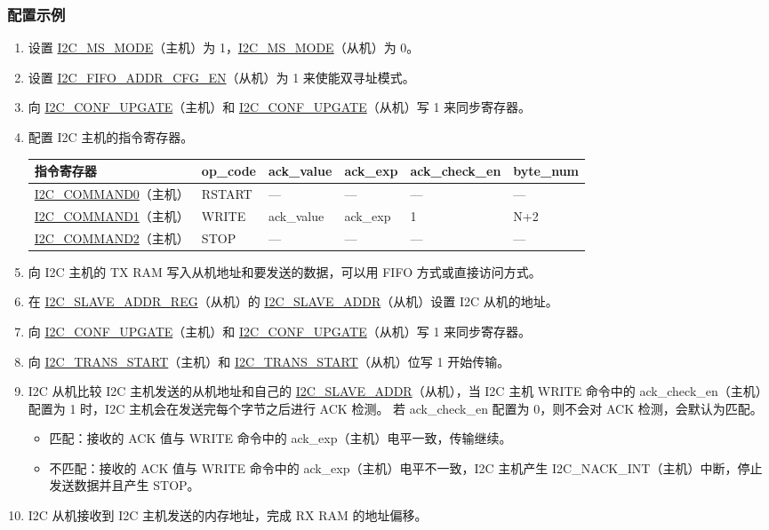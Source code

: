 \documentclass[main\_\_CN.tex]{subfiles}
\begin{document}
\subsubsection{配置示例}
\begin{enumerate}
\item 设置 \hyperref[fielddesc:I2CMSMODE]{I2C\_MS\_MODE}（主机）为 1，\hyperref[fielddesc:I2CMSMODE]{I2C\_MS\_MODE}（从机）为 0。
\item 设置 \hyperref[fielddesc:I2CFIFOADDRCFGEN]{I2C\_FIFO\_ADDR\_CFG\_EN}（从机）为 1 来使能双寻址模式。
\item 向 \hyperref[fielddesc:I2CCONFUPGATE]{I2C\_CONF\_UPGATE}（主机）和 \hyperref[fielddesc:I2CCONFUPGATE]{I2C\_CONF\_UPGATE}（从机）写 1 来同步寄存器。
\item 配置 I2C 主机的指令寄存器。
\begin{longtable}{ | p{4cm} | p{2cm} | p{2cm} | p{2cm} |p{2cm} | p{2cm} |}
\hline\rowcolor{lightgray}
指令寄存器& op\_code & ack\_value&ack\_exp&ack\_check\_en&byte\_num  \\ \hline
\hyperref[fielddesc:I2CCOMMAND0]{I2C\_COMMAND0}（主机）& RSTART& ---&---&---&---  \\ \hline
\hyperref[fielddesc:I2CCOMMAND1]{I2C\_COMMAND1}（主机）& WRITE& ack\_value&ack\_exp&1&N+2  \\ \hline
\hyperref[fielddesc:I2CCOMMAND2]{I2C\_COMMAND2}（主机）& STOP& ---&---&---&---  \\ \hline
\end{longtable}
\item 向 I2C 主机的 TX RAM 写入从机地址和要发送的数据，可以用 FIFO 方式或直接访问方式。
\item 在 \hyperref[regdesc:I2CSLAVEADDRREG]{I2C\_SLAVE\_ADDR\_REG}（从机）的 \hyperref[fielddesc:I2CSLAVEADDR]{I2C\_SLAVE\_ADDR}（从机）设置 I2C 从机的地址。
\item 向 \hyperref[fielddesc:I2CCONFUPGATE]{I2C\_CONF\_UPGATE}（主机）和 \hyperref[fielddesc:I2CCONFUPGATE]{I2C\_CONF\_UPGATE}（从机）写 1 来同步寄存器。
\item 向 \hyperref[fielddesc:I2CTRANSSTART]{I2C\_TRANS\_START}（主机）和 \hyperref[fielddesc:I2CTRANSSTART]{I2C\_TRANS\_START}（从机）位写 1 开始传输。
\item I2C 从机比较 I2C 主机发送的从机地址和自己的 \hyperref[fielddesc:I2CSLAVEADDR]{I2C\_SLAVE\_ADDR}（从机），当 I2C 主机 WRITE 命令中的 ack\_check\_en（主机）配置为 1 时，I2C 主机会在发送完每个字节之后进行 ACK 检测。 若 ack\_check\_en 配置为 0，则不会对 ACK 检测，会默认为匹配。
\begin{itemize}
\item 匹配：接收的 ACK 值与 WRITE 命令中的 ack\_exp（主机）电平一致，传输继续。
\item 不匹配：接收的 ACK 值与 WRITE 命令中的 ack\_exp（主机）电平不一致，I2C 主机产生 I2C\_NACK\_INT（主机）中断，停止发送数据并且产生 STOP。
\end{itemize}
\item I2C 从机接收到 I2C 主机发送的内存地址，完成 RX RAM 的地址偏移。


\end{enumerate}
\end{document}
